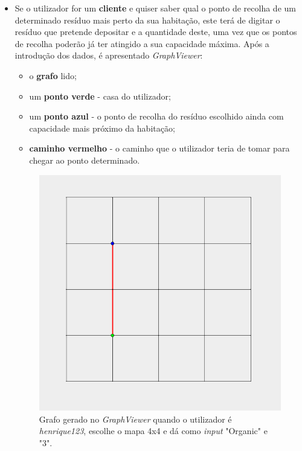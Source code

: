\documentclass[article, a4paper, 12pt, oneside]{memoir}
\begin{document}
\begin{itemize}
	\item Se o utilizador for um \textbf{cliente} e quiser saber qual o ponto de recolha de um determinado resíduo mais perto da sua habitação, este terá de digitar o resíduo que pretende depositar e a quantidade deste, uma vez que os pontos de recolha poderão já ter atingido a sua capacidade máxima. Após a introdução dos dados, é apresentado \textit{GraphViewer}:
	\begin{itemize}
		\item o \textbf{grafo} lido;
		\item um \textbf{ponto verde} - casa do utilizador;
		\item um \textbf{ponto azul} - o ponto de recolha do resíduo escolhido ainda com capacidade mais próximo da habitação;
		\item \textbf{caminho vermelho} - o caminho que o utilizador teria de tomar para chegar ao ponto determinado. 
	\end{itemize}
	
	\begin{figure}[h!]
  		\centerline{\includegraphics[scale=0.7]{wasteapp_4x4henrique123organic.png}}
  		\caption{Grafo gerado no \textit{GraphViewer} quando o utilizador é \textit{henrique123}, escolhe o mapa 4x4 e dá como \textit{input} "Organic" e "3".}
	\end{figure}
	

\end{itemize}
\end{document}
